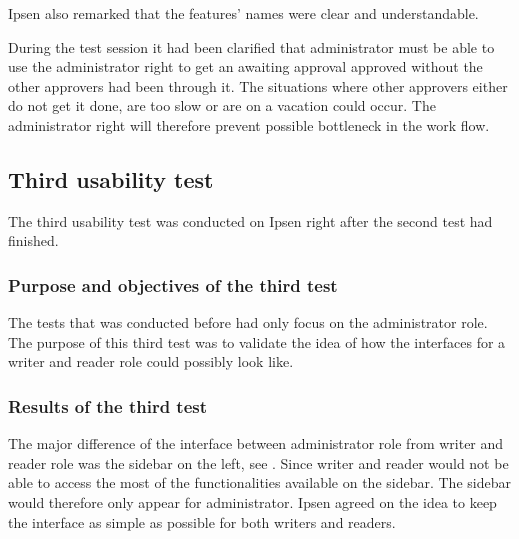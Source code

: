 Ipsen also remarked that the features' names were clear and understandable.

During the test session it had been clarified that administrator must be able to use the administrator right to get an awaiting approval approved without the other approvers had been through it.
The situations where other approvers either do not get it done, are too slow or are on a vacation could occur.
The administrator right will therefore prevent possible bottleneck in the work flow.



\subsection{Third usability test}\label{thirdtest}
The third usability test was conducted on Ipsen right after the second test had finished.

\subsubsection*{Purpose and objectives of the third test}
The tests that was conducted before had only focus on the administrator role.
The purpose of this third test was to validate the idea of how the interfaces for a writer and reader role could possibly look like.

\subsubsection*{Results of the third test}
The major difference of the interface between administrator role from writer and reader role was the sidebar on the left, see .
Since writer and reader would not be able to access the most of the functionalities available on the sidebar.
The sidebar would therefore only appear for administrator.
Ipsen agreed on the idea to keep the interface as simple as possible for both writers and readers.

